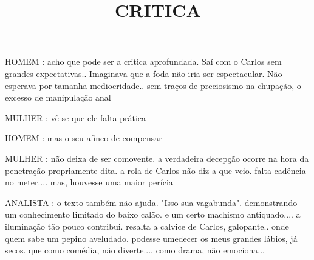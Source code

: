 \documentclass[10pt]{article}
\author{}
\title{\vspace{-3.5cm}CRITICA}
\date{}
\newcommand{\mychar}[1]{
  \bigskip
  \hspace{-2em} \MakeUppercase{#1}
}
\begin{document}
\maketitle



\mychar{HOMEM}: acho que pode ser a critica aprofundada. Saí com o Carlos sem grandes expectativas.. Imaginava que a foda não iria ser espectacular. Não esperava por tamanha mediocridade.. sem traços de preciosismo na chupação, o excesso de manipulação anal

\mychar{MULHER}: vê-se que ele falta prática

\mychar{HOMEM}: mas o seu afinco de compensar

\mychar{MULHER}: não deixa de ser comovente. a verdadeira decepção ocorre na hora da penetração propriamente dita. a rola de Carlos não diz a que veio. falta cadência no meter.... mas, houvesse uma maior perícia

\mychar{ANALISTA}: o texto também não ajuda. "Isso sua vagabunda". demonstrando um conhecimento limitado do baixo calão. e um certo machismo antiquado.... a iluminação tão pouco contribui. resalta a calvice de Carlos, galopante.. onde quem sabe um pepino aveludado. podesse umedecer os meus grandes lábios, já secos. que como comédia, não diverte.... como drama, não emociona...
\end{document}
